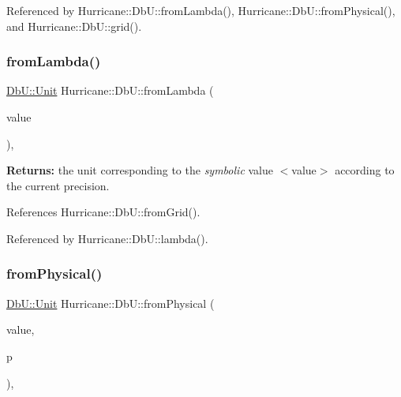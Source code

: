 Referenced by Hurricane\+::\+Db\+U\+::from\+Lambda(), Hurricane\+::\+Db\+U\+::from\+Physical(), and Hurricane\+::\+Db\+U\+::grid().

\mbox{\label{group__DbUGroup_ga4b570755b19ea9ff0f2f258a221bd935}} 
\subsubsection{\texorpdfstring{from\+Lambda()}{fromLambda()}}
{\footnotesize\ttfamily \mbox{\hyperlink{group__DbUGroup_ga4fbfa3e8c89347af76c9628ea06c4146}{Db\+U\+::\+Unit}} Hurricane\+::\+Db\+U\+::from\+Lambda (\begin{DoxyParamCaption}\item[{double}]{value }\end{DoxyParamCaption})\hspace{0.3cm}{\ttfamily [inline]}, {\ttfamily [static]}}

{\bfseries Returns\+:} the unit corresponding to the {\itshape symbolic} value {\ttfamily $<$value$>$} according to the current precision. 

References Hurricane\+::\+Db\+U\+::from\+Grid().



Referenced by Hurricane\+::\+Db\+U\+::lambda().

\mbox{\label{group__DbUGroup_ga11d4dbd9134a19bda35cbacde1cb2769}} 
\subsubsection{\texorpdfstring{from\+Physical()}{fromPhysical()}}
{\footnotesize\ttfamily \mbox{\hyperlink{group__DbUGroup_ga4fbfa3e8c89347af76c9628ea06c4146}{Db\+U\+::\+Unit}} Hurricane\+::\+Db\+U\+::from\+Physical (\begin{DoxyParamCaption}\item[{double}]{value,  }\item[{\mbox{\hyperlink{group__DbUGroup_ga50b5785bf4d75026c4c112caec3040a7}{Unit\+Power}}}]{p }\end{DoxyParamCaption})\hspace{0.3cm}{\ttfamily [inline]}, {\ttfamily [static]}}

